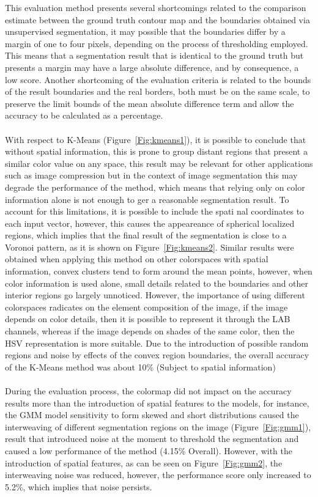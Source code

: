 \documentclass[10pt,twocolumn,letterpaper]{article}
\begin{document}
This evaluation method presents several shortcomings related to the comparison estimate between the ground truth contour map and the boundaries obtained via unsupervised segmentation, it may possible that the boundaries differ by a margin of one to four pixels, depending on the process of thresholding employed. This means that a segmentation result that is identical to the ground truth but presents a margin may have a large absolute difference, and by consequence, a low score. Another shortcoming of the evaluation criteria is related to the bounds of the result boundaries and the real borders, both must be on the same scale, to preserve the limit bounds of the mean absolute difference term and allow the accuracy to be calculated as a percentage.  
\\
\\
 With respect to K-Means (Figure~\ref{Fig:kmeans1}), it is possible to conclude that without spatial information, this is prone to group distant regions that present a similar color value on any space, this result may be relevant for other applications such as image compression but in the context of image segmentation this may degrade the performance of the method, which means that relying only on color information alone is not enough to ger a reasonable segmentation result. To account for this limitations, it is possible to include the spati nal coordinates to each input vector, however, this causes the appeareance of spherical localized regions, which implies that the final result of the segmentation is close to a Voronoi pattern, as it is shown on Figure~\ref{Fig:kmeans2}. Similar results were obtained when applying this method on other colorspaces with spatial information, convex clusters tend to form around the mean points, however, when color information is used alone, small details related to the boundaries and other interior regions go largely unnoticed. However, the importance of using different colorspaces radicates on the element composition of the image, if the image depends on color details, then it is possible to represent it through the LAB channels, whereas if the image depends on shades of the same color, then the HSV representation is more suitable. Due to the introduction of possible random regions and noise by effects of the convex region boundaries, the overall accuracy of the K-Means method was about 10\% (Subject to spatial information)
 \\
 \\
 During the evaluation process, the colormap did not impact on the accuracy results more than the introduction of spatial features to the models, for instance, the GMM model sensitivity to form skewed   and short distributions caused the interweaving of different segmentation regions on the image (Figure~\ref{Fig:gmm1}), result that introduced noise at the moment to threshold the segmentation and caused a low performance of the method (4.15\% Overall). However, with the introduction of spatial features, as can be seen on Figure~\ref{Fig:gmm2}, the interweaving noise was reduced, however, the performance score only increased to 5.2\%, which implies that noise persists.
\end{document}

